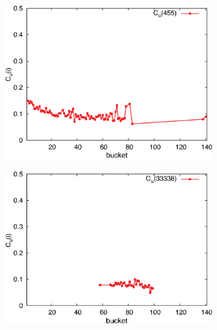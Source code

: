 \begin{figure}[H]
\begin{subfigure}[b]{0.32\textwidth}
        \end{subfigure}
        \begin{subfigure}[b]{0.32\textwidth}
          \centering
          \includegraphics[width=\textwidth]{chapters/03_implementation/u455}
        \end{subfigure}
        \begin{subfigure}[b]{0.32\textwidth}
          \centering
          \includegraphics[width=\textwidth]{chapters/03_implementation/u33338}
        \end{subfigure}
        \begin{subfigure}[b]{0.32\textwidth}
          \centering

\end{subfigure}
\end{figure}
